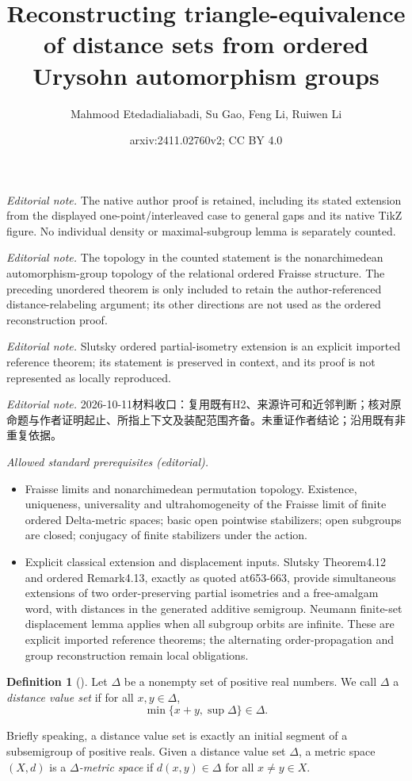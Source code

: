 \documentclass[10pt,a4paper]{amsart}
\title{Reconstructing triangle-equivalence of distance sets from ordered Urysohn automorphism groups}
\author{Mahmood Etedadialiabadi, Su Gao, Feng Li, Ruiwen Li}
\date{arxiv:2411.02760v2; CC BY 4.0}
\theoremstyle{definition}
\newtheorem{definition}{Definition}[section]
\theoremstyle{remark}
\begin{document}
\maketitle
\noindent\textit{Editorial note.} The native author proof is retained, including its stated extension from the displayed one-point/interleaved case to general gaps and its native TikZ figure. No individual density or maximal-subgroup lemma is separately counted.\par\medskip
\noindent\textit{Editorial note.} The topology in the counted statement is the nonarchimedean automorphism-group topology of the relational ordered Fraisse structure. The preceding unordered theorem is only included to retain the author-referenced distance-relabeling argument; its other directions are not used as the ordered reconstruction proof.\par\medskip
\noindent\textit{Editorial note.} Slutsky ordered partial-isometry extension is an explicit imported reference theorem; its statement is preserved in context, and its proof is not represented as locally reproduced.\par\medskip
\noindent\textit{Editorial note.} 2026-10-11材料收口：复用既有H2、来源许可和近邻判断；核对原命题与作者证明起止、所指上下文及装配范围齐备。未重证作者结论；沿用既有非重复依据。\par\medskip
\noindent\textit{Allowed standard prerequisites (editorial).}\begin{itemize}
\item Fraisse limits and nonarchimedean permutation topology. Existence, uniqueness, universality and ultrahomogeneity of the Fraisse limit of finite ordered Delta-metric spaces; basic open pointwise stabilizers; open subgroups are closed; conjugacy of finite stabilizers under the action.
\item Explicit classical extension and displacement inputs. Slutsky Theorem4.12 and ordered Remark4.13, exactly as quoted at653-663, provide simultaneous extensions of two order-preserving partial isometries and a free-amalgam word, with distances in the generated additive semigroup. Neumann finite-set displacement lemma applies when all subgroup orbits are infinite. These are explicit imported reference theorems; the alternating order-propagation and group reconstruction remain local obligations.
\end{itemize}\medskip
    \begin{definition}[\cite{EGLMM}]
        Let $\Delta$ be a nonempty set of positive real numbers. We call $\Delta$ a {\em distance value set} if for all $x, y\in \Delta$, 
        \begin{equation*}
           \min\{ x+y, \sup\Delta\} \in \Delta.
        \end{equation*}
    \end{definition}
Briefly speaking, a distance value set is exactly an initial segment of a subsemigroup of positive reals. Given a distance value set $\Delta$, a metric space $(X,d)$ is a {\em $\Delta$-metric space} if $d(x,y)\in\Delta$ for all $x\neq y\in X$. 
\end{document}
